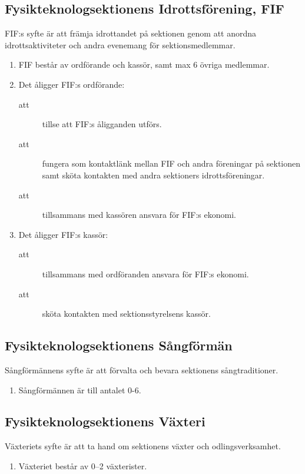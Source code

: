 \documentclass[11pt,a4paper]{article}
\begin{document}
\subsection{Fysikteknologsektionens Idrottsförening, FIF}
FIF:s syfte är att främja idrottandet på sektionen genom att anordna idrottsaktiviteter och andra evenemang för sektionsmedlemmar.
\begin{enumerate}[\thesubsection .1]

  \item FIF består av ordförande och kassör, samt max 6 övriga
  medlemmar.

  \item Det åligger FIF:s ordförande:
    \begin{description}
      \item[att] tillse att FIF:s åligganden utförs.
      \item[att] fungera som kontaktlänk mellan FIF och andra
      föreningar på sektionen samt sköta kontakten med andra
      sektioners idrotts\-före\-ning\-ar.
      \item[att] tillsammans med kassören ansvara för FIF:s ekonomi.
    \end{description}

  \item Det åligger FIF:s kassör:
    \begin{description}
      \item[att] tillsammans med ordföranden ansvara för FIF:s ekonomi.
      \item[att] sköta kontakten med sektionsstyrelsens kassör.
    \end{description}

\end{enumerate}

\subsection{Fysikteknologsektionens Sångförmän}
Sångförmännens syfte är att förvalta och bevara sektionens sångtraditioner.
\begin{enumerate}[\thesubsection .1]

  \item Sångförmännen är till antalet 0-6.

\end{enumerate}

\subsection{Fysikteknologsektionens Växteri}
Växteriets syfte är att ta hand om sektionens växter och odlingsverksamhet.
\begin{enumerate}[\thesubsection .1]

  \item Växteriet består av 0--2 växterister.

\end{enumerate}
\end{document}
